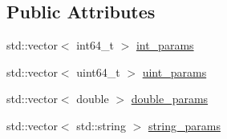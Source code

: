 \subsection*{Public Attributes}
\begin{DoxyCompactItemize}
\item 
std\-::vector$<$ int64\-\_\-t $>$ \hyperlink{structcrow_1_1routing__params_a5d5bc98dbf4ab889061956effe901bcb}{int\-\_\-params}
\item 
std\-::vector$<$ uint64\-\_\-t $>$ \hyperlink{structcrow_1_1routing__params_ae221103dd3c93ee5731554512dd9f537}{uint\-\_\-params}
\item 
std\-::vector$<$ double $>$ \hyperlink{structcrow_1_1routing__params_a090754b18f2bec903ae3db739a2b15c3}{double\-\_\-params}
\item 
std\-::vector$<$ std\-::string $>$ \hyperlink{structcrow_1_1routing__params_a77e66f381580c9faf2b0d06127f65142}{string\-\_\-params}
\end{DoxyCompactItemize}


